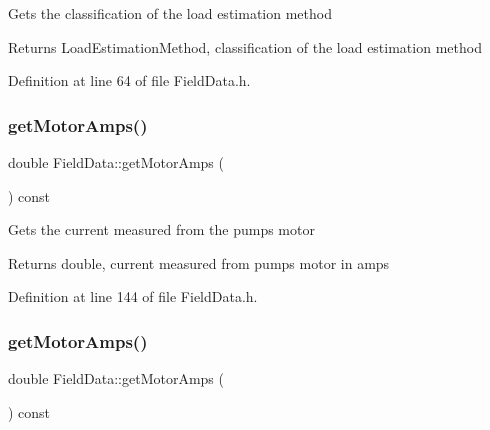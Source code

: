 Gets the classification of the load estimation method

\begin{DoxyReturn}{Returns}
Load\+Estimation\+Method, classification of the load estimation method 
\end{DoxyReturn}


Definition at line 64 of file Field\+Data.\+h.

\mbox{\label{class_field_data_ad2b4fffb00fa7cfa6f69487e1034989a}} 
\subsubsection{\texorpdfstring{get\+Motor\+Amps()}{getMotorAmps()}\hspace{0.1cm}{\footnotesize\ttfamily [1/3]}}
{\footnotesize\ttfamily double Field\+Data\+::get\+Motor\+Amps (\begin{DoxyParamCaption}{ }\end{DoxyParamCaption}) const\hspace{0.3cm}{\ttfamily [inline]}}

Gets the current measured from the pump\textquotesingle{}s motor

\begin{DoxyReturn}{Returns}
double, current measured from pump\textquotesingle{}s motor in amps 
\end{DoxyReturn}


Definition at line 144 of file Field\+Data.\+h.

\mbox{\label{class_field_data_ad2b4fffb00fa7cfa6f69487e1034989a}} 
\subsubsection{\texorpdfstring{get\+Motor\+Amps()}{getMotorAmps()}\hspace{0.1cm}{\footnotesize\ttfamily [2/3]}}
{\footnotesize\ttfamily double Field\+Data\+::get\+Motor\+Amps (\begin{DoxyParamCaption}{ }\end{DoxyParamCaption}) const\hspace{0.3cm}{\ttfamily [inline]}}

